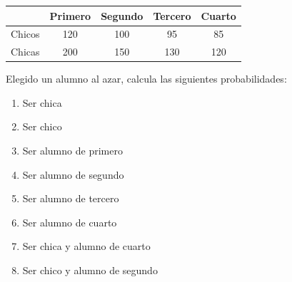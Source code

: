 \documentclass[fleqn]{article}
\begin{document}
\begin{enumerate}
\begin{tabular}{|c|c|c|c|c|}
\hline 
 & Primero & Segundo & Tercero & Cuarto \\ 
\hline 
Chicos & 120 & 100 & 95 & 85 \\ 
\hline 
Chicas & 200 & 150 & 130 & 120 \\ 
\hline 
\end{tabular}

Elegido un alumno al azar, calcula las siguientes probabilidades:
\begin{enumerate}
\item Ser chica \noanswer
\item Ser chico \noanswer
\item Ser alumno de primero \noanswer
\item Ser alumno de segundo \noanswer
\item Ser alumno de tercero \noanswer
\item Ser alumno de cuarto \noanswer
\item Ser chica y alumno de cuarto \noanswer
\item Ser chico y alumno de segundo \noanswer
\end{enumerate}
 \end{enumerate}
\end{document}
